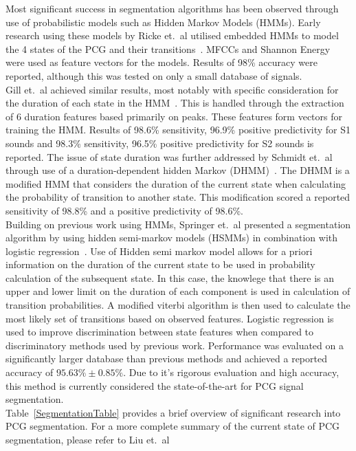 \documentclass[titlepage, 12pt]{scrartcl} \usepackage{enumitem}
\begin{document}
Most significant success in segmentation algorithms has been observed through use
of probabilistic models such as Hidden Markov Models (HMMs). Early research
using these models by Ricke et.\ al utilised embedded HMMs to model the 4
states of the PCG and their transitions~\parencite{Ricke2005}. MFCCs and
Shannon Energy were used as feature vectors for the models. Results of
98\% accuracy were reported, although this was tested on only a small database
of signals.\\
Gill et.\ al achieved similar results, most notably with specific consideration
for the duration of each state in the HMM~\parencite{Gill2005}. This is
handled through the extraction of 6 duration features based primarily on peaks.
These features form vectors for training the HMM. Results of 98.6\%
sensitivity, 96.9\% positive predictivity for S1 sounds and 98.3\% sensitivity,
96.5\% positive predictivity for S2 sounds is reported.
The issue of state duration was further addressed by Schmidt et.\ al through use
of a duration-dependent hidden Markov (DHMM)~\parencite{Schmidt2015}. The
DHMM is a modified HMM that considers the duration of the current state when
calculating the probability of transition to another state. This modification
scored a reported sensitivity of 98.8\% and a positive predictivity of
98.6\%.\\
Building on previous work using HMMs, Springer et.\ al presented a segmentation
algorithm by using hidden semi-markov models (HSMMs) in combination with
logistic regression~\parencite{Springer2016}. Use of Hidden semi markov model
allows for a priori information on the duration of the current state to be used
in probability calculation of the subsequent state. In this case, the knowlege
that there is an upper and lower limit on the duration of each component is
used in calculation of transition probabilities.  A modified viterbi algorithm
is then used to calculate the most likely set of transitions based on observed
features. Logistic regression is used to improve discrimination between state
features when compared to discriminatory methods used by previous work.
Performance was evaluated on a significantly larger database than previous
methods and achieved a reported accuracy of $95.63\% \pm 0.85\%$. Due to it's
rigorous evaluation and high accuracy, this method is currently considered the
state-of-the-art for PCG signal segmentation.\\

Table~\ref{SegmentationTable} provides a brief overview of significant research
into PCG segmentation. For a more complete summary of the current state of PCG
segmentation, please refer to Liu et.\ al~\parencite{Liu2016}
\end{document}
